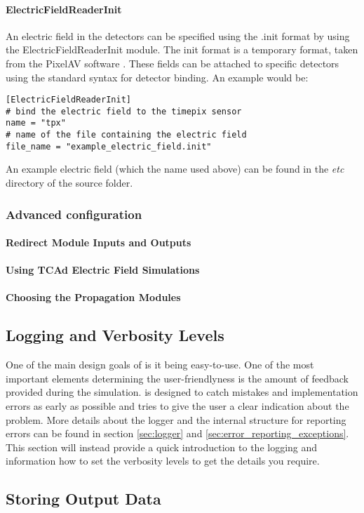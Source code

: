 \paragraph{ElectricFieldReaderInit}
An electric field in the detectors can be specified using the .init format by using the ElectricFieldReaderInit module. The init format is a temporary format, taken from the PixelAV software\cite{pixelavgit} . These fields can be attached to specific detectors using the standard syntax for detector binding. An example would be:
\begin{verbatim}
[ElectricFieldReaderInit]
# bind the electric field to the timepix sensor
name = "tpx"
# name of the file containing the electric field
file_name = "example_electric_field.init"
\end{verbatim}
An example electric field (which the name used above) can be found in the \textit{etc} directory of the \apsq source folder.

\subsubsection{Advanced configuration}
\paragraph{Redirect Module Inputs and Outputs}
\wip

\paragraph{Using TCAd Electric Field Simulations}
\wip

\paragraph{Choosing the Propagation Modules}
\wip

\subsection{Logging and Verbosity Levels}
\label{sec:logging_verbosity}
One of the main design goals of \apsq is it being easy-to-use. One of the most important elements determining the user-friendlyness is the amount of feedback provided during the simulation. \apsq is designed to catch mistakes and implementation errors as early as possible and tries to give the user a clear indication about the problem. More details about the logger and the internal structure for reporting errors can be found in section \ref{sec:logger} and \ref{sec:error_reporting_exceptions}. This section will instead provide a quick introduction to the logging and information how to set the verbosity levels to get the details you require.


\subsection{Storing Output Data}
\wip
